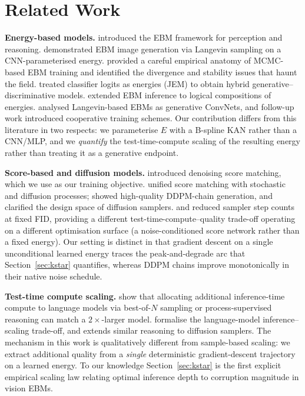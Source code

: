 \documentclass{article}
\begin{document}
\section{Related Work}
\label{sec:related}

\textbf{Energy-based models.} \citet{lecun2006ebm} introduced the EBM framework
for perception and reasoning. \citet{du2019implicit} demonstrated EBM image
generation via Langevin sampling on a CNN-parameterised energy.
\citet{nijkamp2019anatomy} provided a careful empirical anatomy of MCMC-based
EBM training and identified the divergence and stability issues that haunt the
field. \citet{grathwohl2019jempp} treated classifier logits as energies (JEM)
to obtain hybrid generative--discriminative models. \citet{du2021conjunction}
extended EBM inference to logical compositions of energies.
\citet{xie2016theory} analysed Langevin-based EBMs as generative ConvNets, and
follow-up work \citep{gao2020learning} introduced cooperative training schemes.
Our contribution differs from this literature in two respects: we
parameterise $E$ with a B-spline KAN rather than a CNN/MLP, and we
\emph{quantify} the test-time-compute scaling of the resulting energy rather
than treating it as a generative endpoint.

\textbf{Score-based and diffusion models.} \citet{vincent2011dsm} introduced
denoising score matching, which we use as our training objective.
\citet{song2019generative,song2020improved,song2021score} unified score
matching with stochastic and diffusion processes; \citet{ho2020ddpm} showed
high-quality DDPM-chain generation, and \citet{karras2022elucidating}
clarified the design space of diffusion samplers. \citet{kim2022softtruncation}
and \citet{lu2022dpmsolver} reduced sampler step counts at fixed FID, providing
a different test-time-compute--quality trade-off operating on a different
optimisation surface (a noise-conditioned score network rather than a fixed
energy). Our setting is distinct in that gradient descent on a single
unconditional learned energy traces the peak-and-degrade arc that
Section~\ref{sec:kstar} quantifies, whereas DDPM chains improve monotonically
in their native noise schedule.

\textbf{Test-time compute scaling.} \citet{snell2024llm} show that allocating
additional inference-time compute to language models via best-of-$N$ sampling
or process-supervised reasoning can match a $2{\times}$-larger model.
\citet{brown2024llm_scaling} formalise the language-model inference--scaling
trade-off, and \citet{wu2024inference} extends similar reasoning to diffusion
samplers. The mechanism in this work is qualitatively different from
sample-based scaling: we extract additional quality from a \emph{single}
deterministic gradient-descent trajectory on a learned energy. To our
knowledge Section~\ref{sec:kstar} is the first explicit empirical scaling law
relating optimal inference depth to corruption magnitude in vision EBMs.
\end{document}
